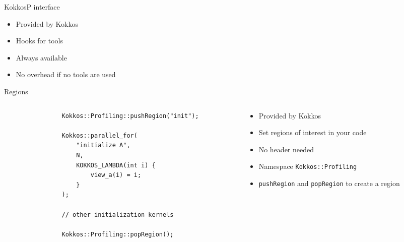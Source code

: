 \documentclass[
    aspectratio=169,
    handout,
]{beamer}
\begin{document}

\begin{frame}{KokkosP interface}
    \begin{itemize}
        \item Provided by Kokkos
        \item Hooks for tools
        \item Always available
        \item No overhead if no tools are used
    \end{itemize}
\end{frame}


\begin{frame}[fragile]{Regions}
    \begin{columns}
        \begin{column}{0.6\linewidth}
            \begin{verbatim}
                Kokkos::Profiling::pushRegion("init");

                Kokkos::parallel_for(
                    "initialize A",
                    N,
                    KOKKOS_LAMBDA(int i) {
                        view_a(i) = i;
                    }
                );

                // other initialization kernels

                Kokkos::Profiling::popRegion();
            \end{verbatim}
        \end{column}
        \begin{column}{0.4\linewidth}
            \begin{itemize}
                \item Provided by Kokkos
                \item Set regions of interest in your code
                \item No header needed
                \item Namespace \texttt{Kokkos::Profiling}
                \item \texttt{pushRegion} and \texttt{popRegion} to create a region
            \end{itemize}
        \end{column}
    \end{columns}
\end{frame}
\end{document}
